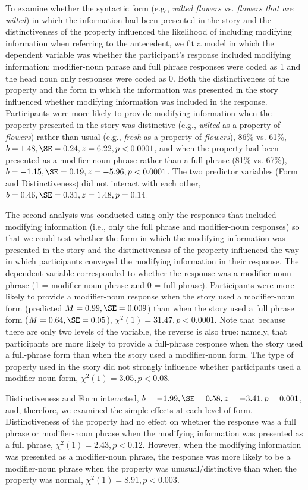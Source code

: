 \documentclass[output=paper]{langsci/langscibook}
\begin{document}
To examine whether the syntactic form (e.g., \textit{wilted flowers}
vs. \textit{flowers that are wilted}) in which the information had
been presented in the story and the distinctiveness of the property
influenced the likelihood of including modifying information when
referring to the antecedent, we fit a model in which the dependent
variable was whether the participant’s response included modifying
information; modifier-noun phrase and full phrase responses were coded
as 1 and the head noun only responses were coded as 0. Both the
distinctiveness of the property and the form in which the information
was presented in the story influenced whether modifying information
was included in the response. Participants were more likely to provide
modifying information when the property presented in the story was
distinctive (e.g., \textit{wilted} as a property of \textit{flowers})
rather than usual (e.g., \textit{fresh} as a property of
\textit{flowers}), 86\% vs. 61\%, $b=1.48, \SE=0.24, z=6.22, p<0.0001$, and
when the property had been presented as a modifier-noun phrase rather
than a full-phrase (81\% vs. 67\%), $b=-1.15, \SE=0.19, z=-5.96,
p<0.0001$. The two predictor variables (Form and Distinctiveness) did
not interact with each other, $b=0.46, \SE=0.31, z=1.48, p=0.14$.

The second analysis was conducted using only the responses that
included modifying information (i.e., only the full phrase and
modifier-noun responses) so that we could test whether the form in
which the modifying information was presented in the story and the
distinctiveness of the property influenced the way in which
participants conveyed the modifying information in their response. The
dependent variable corresponded to whether the response was a
modifier-noun phrase (1 = modifier-noun phrase and 0 = full
phrase). Participants were more likely to provide a modifier-noun
response when the story used a modifier-noun form (predicted $M=0.99,
\SE=0.009$) than when the story used a full phrase form ($M=0.64, \SE=0.05$),
$\chi^2(1)=31.47, p<0.0001$. Note that because there are only two
levels of the variable, the reverse is also true: namely, that
participants are more likely to provide a full-phrase response when
the story used a full-phrase form than when the story used a
modifier-noun form. The type of property used in the story did not
strongly influence whether participants used a modifier-noun form,
$\chi^2(1)=3.05, p<0.08$.

Distinctiveness and Form interacted, $b=-1.99, \SE=0.58, z=-3.41, p=0.001$,
and, therefore, we examined the simple effects at each level of
form. Distinctiveness of the property had no effect on whether the
response was a full phrase or modifier-noun phrase when the modifying
information was presented as a full phrase, $\chi^2(1)=2.43,
p<0.12$. However, when the modifying information was presented as a
modifier-noun phrase, the response was more likely to be a
modifier-noun phrase when the property was unusual/distinctive than
when the property was normal, $\chi^2(1)=8.91, p<0.003$.
\end{document}
